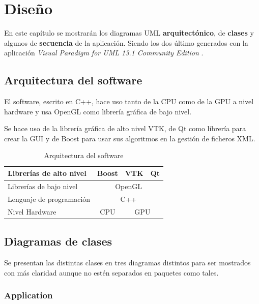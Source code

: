 \chapter{Diseño}

En este capítulo se mostrarán los diagramas UML \textbf{arquitectónico}, de \textbf{clases} y algunos de \textbf{secuencia} de la aplicación. Siendo los dos último generados con la aplicación \textit{Visual Paradigm for UML 13.1 Community Edition} \cite{vpp}.

\section{Arquitectura del software}

El software, escrito en C++, hace uso tanto de la CPU como de la GPU a nivel hardware y usa OpenGL como librería gráfica de bajo nivel.

Se hace uso de la librería gráfica de alto nivel VTK, de Qt como librería para crear la GUI y de Boost para usar sus algoritmos en la gestión de ficheros XML.

\begin{table}[H]
	\begin{center}
		\begin{tabular}{|l|c|c|c|c|}
			\hline
			Librerías de alto nivel  & \multicolumn{2}{c|}{Boost} & VTK        & Qt        \\ \hline
			Librerías de bajo nivel  & \multicolumn{4}{c|}{OpenGL}                         \\ \hline
			Lenguaje de programación & \multicolumn{4}{c|}{C++}                            \\ \hline
			Nivel Hardware           & \multicolumn{2}{c|}{CPU} & \multicolumn{2}{c|}{GPU} \\ \hline
		\end{tabular}
	\end{center}
	\caption{Arquitectura del software}
	\label{tab:diagrama_arquitectonico}
\end{table}

\section{Diagramas de clases}

Se presentan las distintas clases en tres diagramas distintos para ser mostrados con más claridad aunque no estén separados en paquetes como tales.

\subsection{Application}

